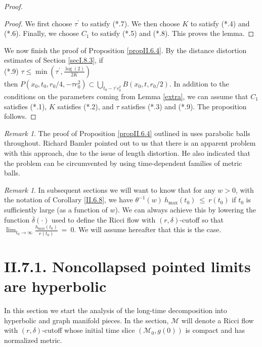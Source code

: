 \documentclass[12pt]{amsart}
\newcommand{\M}{{\mathcal M}}
\newcommand{\ra}{\rightarrow}
\numberwithin{equation}{section}
\theoremstyle{plain}
\theoremstyle{definition}
\theoremstyle{remark}
\newtheorem{remark}[equation]{Remark}
\begin{document}
\begin{proof}
\begin{proof}
We first choose $\tau^\prime$ to satisfy (*.7).
We then choose $K$ to satisfy (*.4) and (*.6).
Finally, we choose $C_1$ to
satisfy (*.5) and (*.8).
This proves the lemma.
\end{proof}

We now finish the proof of Proposition \ref{propII.6.4}.
By the distance distortion estimates of Section \ref{secI.8.3}, if\\
(*.9) $\tau \le \min \left( \tau^\prime, \frac{\log(2)}{2K} \right)$\\
then $P(x_0, t_0, r_0/4, -\tau r_0^2) \subset 
\bigcup_{t_0 - \tau^\prime r_0^2} B(x_0, t, r_0/2)$.
In addition to the conditions on the parameters coming from
Lemma \ref{extra}, we can assume that $C_1$ satisfies (*.1),
$K$ satisfies (*.2), and
$\tau$ satisfies (*.3) and (*.9). The proposition follows. 
\end{proof}

\begin{remark}
The proof of Proposition \ref{propII.6.4} outlined in
\cite[Pf. of II.6.4]{Perelman2}
uses parabolic balls throughout.  Richard Bamler pointed out
to us that there is an apparent problem with this approach,
due to the issue of length distortion.
He also indicated that the problem can be circumvented
by using time-dependent families of metric balls.
\end{remark}

\begin{remark} \label{hmax}
In subsequent sections we will want to know that for any
$w > 0$, with the notation
of Corollary \ref{II.6.8}, we have
$\theta^{-1}(w) \: h_{\max}(t_0) \: \le \: r(t_0)$ if $t_0$ is
sufficiently large (as a function of $w$).
We can always achieve this by lowering the function $\overline{\delta}(\cdot)$
used to define the Ricci flow with $(r, \delta)$-cutoff so that
$\lim_{t_0 \ra \infty} \frac{h_{\max}(t_0)}{r(t_0)} \: = \: 0$.
We will assume hereafter that this is the case.
\end{remark}

\section{II.7.1. Noncollapsed pointed limits are hyperbolic} \label{II.7.1}

In this section we start the analysis of the long-time decomposition
into hyperbolic and graph manifold pieces. In the section,
$\M$ will denote a Ricci flow with $(r,\delta)$-cutoff whose initial time slice
$(\M_0, g(0))$ is compact and has normalized metric.
\end{document}

